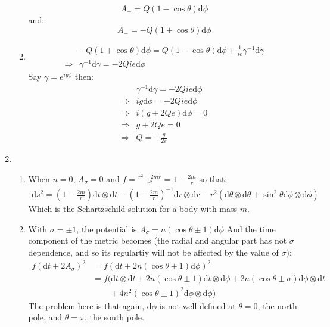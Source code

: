 \documentclass[12pt,a4]{article}
\newcommand{\e}{\mathrm{d}}
\begin{document}
\begin{enumerate}
\begin{enumerate}
        \begin{equation*}
          A_+ = Q (1 - \cos \theta) \e \phi
        \end{equation*}
        and:
        \begin{equation*}
          A_- = -Q (1 + \cos \theta) \e \phi
        \end{equation*}
      \item
        \begin{align*}
                      & -Q (1 + \cos \theta) \e \phi =  Q (1 - \cos \theta) \e \phi + \frac{1}{ie} \gamma^{-1} \e \gamma\\
          \Rightarrow &  \gamma^{-1} \e \gamma = - 2Q i e \e \phi
        \end{align*}
        Say $\gamma = e^{i g \phi}$ then:
        \begin{align*}
                      &  \gamma^{-1} \e \gamma = - 2Q i e \e \phi\\
          \Rightarrow &  i  g \e \phi= - 2Q i e \e \phi\\
          \Rightarrow &  i( g + 2 Q e)  \e \phi = 0\\
          \Rightarrow &  g + 2 Q e = 0\\
          \Rightarrow &  Q = - \frac{g}{2 e}
        \end{align*}

        
    \end{enumerate}
  \item
    \begin{enumerate}
      \item
        When $n = 0$, $A_\sigma = 0$ and $f = \frac{r^2 - 2 m r}{r^2} = 1 - \frac{2 m}{r}$ so that:
        \begin{align*}
          \e s^2 = \left(1 - \frac{2 m}{r}\right)\e t \otimes \e t - \left(1 - \frac{2 m}{r}\right)^{-1}\e r \otimes \e r - r^2 (\e \theta \otimes \e \theta + \sin^2 \theta \e \phi \otimes \e \phi)
        \end{align*}
        Which is the Schartzschild solution for a body with mass $m$.
      \item
        With $\sigma = \pm 1$, the potential is $A_\sigma = n(\cos \theta \pm 1) \e \phi$
        And the time component of the metric becomes (the radial and angular part has not $\sigma$ dependence, and so its regulartiy will not be affected by the value of 
        $\sigma$):
        \begin{align*}
          f(\e t + 2 A_\sigma)^2 &= f(\e t + 2 n (\cos\theta \pm 1) \e \phi)^2\\
                                 &= f(\e t \otimes \e t + 2 n (\cos\theta \pm 1) \e t \otimes \e \phi + 2 n (\cos\theta \pm \sigma) \e \phi \otimes \e t\\
                                 &\qquad + 4 n^2 (\cos\theta \pm 1)^2 \e \phi \otimes \e \phi)
        \end{align*}
        The problem here is that again, $\e \phi$ is not well defined at $\theta = 0$, the north pole, and $\theta = \pi$, the south pole.
    \end{enumerate}
\end{enumerate}
\end{document}
